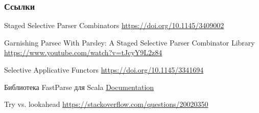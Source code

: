 \documentclass[aspectratio=169
  , xcolor={svgnames}
  , hyperref={ colorlinks,citecolor=Blue
             , linkcolor=DarkRed,urlcolor=DarkBlue}
  , usenames, dvipsnames
  , russian
  ]{beamer}
\begin{document}


%
%

\begin{frame}[allowframebreaks]
\frametitle<presentation>{Ссылки}
\begin{thebibliography}{10}

    Staged Selective Parser Combinators
    \newblock \url{https://doi.org/10.1145/3409002}

    Garnishing Parsec With Parsley: A Staged Selective Parser Combinator Library
    \newblock \url{https://www.youtube.com/watch?v=tJcyY9L2z84}


     Selective Applicative Functors
    \newblock \url{https://doi.org/10.1145/3341694}
 
    Библиотека FastParse для Scala
    \newblock \href{https://webcache.googleusercontent.com/search?q=cache:WSoAEDqEOakJ:https://www.lihaoyi.com/fastparse/}{Documentation}
   
    Try vs. lookahead
    \newblock \url{https://stackoverflow.com/questions/20020350}
    
%
%
%
    
\end{thebibliography}
 \end{frame}
\end{document}
